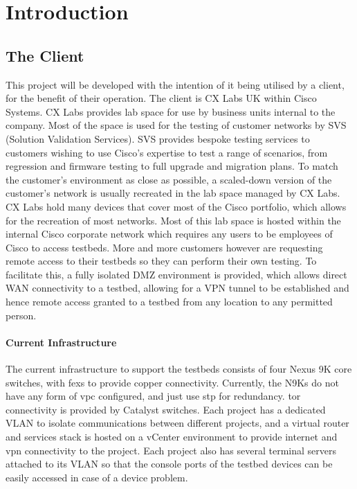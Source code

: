 \chapter{Introduction}
\label{chap:intro}

\section{The Client}
\label{intro:client}
This project will be developed with the intention of it
being utilised by a client, for the benefit of their operation.
The client is
CX Labs UK within Cisco Systems. CX Labs provides lab space for
use by business
units internal to the company. Most of the space is used for
the testing of
customer networks by SVS (Solution Validation Services). SVS
provides bespoke
testing services to customers wishing to use Cisco’s expertise
to test a range
of scenarios, from regression and firmware testing to full
upgrade and
migration plans.\newline
To match the customer's environment as close as
possible, a scaled-down
version of the customer's network is usually recreated
in the lab space managed
by CX Labs. CX Labs hold many devices that cover most
of the Cisco portfolio,
which allows for the recreation of most networks. Most
of this lab space is
hosted within the internal Cisco corporate network which
requires any users to
be employees of Cisco to access testbeds. More and more
customers
however are requesting remote access to their testbeds so they can
perform their own testing. To facilitate this, a
fully isolated DMZ environment
is provided, which allows direct WAN
connectivity to a testbed, allowing for a
VPN tunnel to be established and
hence remote access granted to a testbed from
any location to any permitted
person.

\subsubsection{Current Infrastructure}
The current infrastructure to support the testbeds consists of four Nexus 9K
core switches, with \gls{fex}s to provide copper connectivity. Currently, the
N9Ks do not have any form of \gls{vpc} configured, and just use \gls{stp} for
redundancy. \gls{tor} connectivity is provided by Catalyst switches. Each
project has a dedicated VLAN to isolate communications between different
projects, and a virtual router and services stack is hosted on a vCenter
environment to provide internet and \gls{vpn} connectivity to the project. Each
project also has several terminal servers attached to its VLAN so that the
console ports of the testbed devices can be easily accessed in case of a device
problem.

